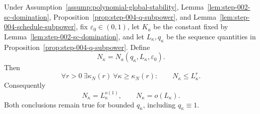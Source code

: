 \begin{proposition}
\label{prop:step-004-sample-subpower}
Under Assumption~\ref{assump:polynomial-global-stability},
Lemma~\ref{lem:step-002-sc-domination},
Proposition~\ref{prop:step-004-q-subpower}, and
Lemma~\ref{lem:step-004-schedule-subpower}, fix
\(\varepsilon_0\in(0,1)\), let \(K_a\) be the constant fixed by
Lemma~\ref{lem:step-002-sc-domination}, and let
\(L_\kappa,q_\kappa\) be the sequence quantities in
Proposition~\ref{prop:step-004-q-subpower}.  Define
\[
N_\kappa=N_a(q_\kappa,L_\kappa,\varepsilon_0).
\]
Then
\begin{equation}
\forall r>0\ \exists\kappa_N(r)\
\forall\kappa\geq\kappa_N(r):
\qquad N_\kappa\leq L_\kappa^r.
\label{eq:app-a81}
\end{equation}
Consequently
\begin{equation}
N_\kappa=L_\kappa^{o(1)},\qquad
N_\kappa=o(L_\kappa).
\label{eq:app-a82}
\end{equation}
Both conclusions remain true for bounded \(q_\kappa\), including
\(q_\kappa\equiv1\).
\end{proposition}

